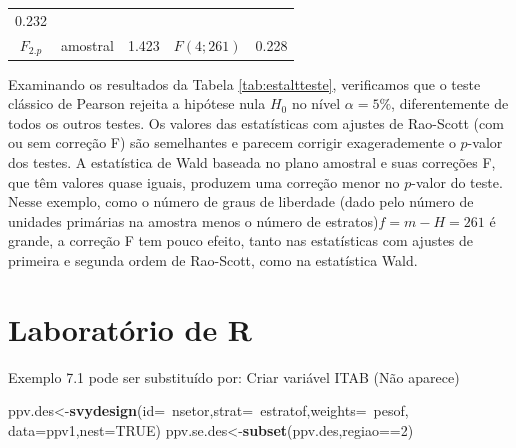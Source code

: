 \documentclass[]{book}
\newenvironment{Shaded}{\begin{snugshade}}{\end{snugshade}}
\newcommand{\KeywordTok}[1]{\textcolor[rgb]{0.13,0.29,0.53}{\textbf{{#1}}}}
\newcommand{\DataTypeTok}[1]{\textcolor[rgb]{0.13,0.29,0.53}{{#1}}}
\newcommand{\DecValTok}[1]{\textcolor[rgb]{0.00,0.00,0.81}{{#1}}}
\newcommand{\OtherTok}[1]{\textcolor[rgb]{0.56,0.35,0.01}{{#1}}}
\newcommand{\NormalTok}[1]{{#1}}
\numberwithin{example}{chapter}
\numberwithin{remark}{chapter}
\numberwithin{definition}{chapter}
\begin{document}
\begin{longtable}[]{@{}cclcr@{}}
\begin{minipage}[t]{0.08\columnwidth}
0.232\strut
\end{minipage}\tabularnewline
\begin{minipage}[t]{0.39\columnwidth}\centering\strut
\(F_{2.p}\)\strut
\end{minipage} & \begin{minipage}[t]{0.15\columnwidth}\centering\strut
amostral\strut
\end{minipage} & \begin{minipage}[t]{0.05\columnwidth}\raggedright\strut
1.423\strut
\end{minipage} & \begin{minipage}[t]{0.19\columnwidth}\centering\strut
\(F\left( 4;261\right)\)\strut
\end{minipage} & \begin{minipage}[t]{0.08\columnwidth}\raggedleft\strut
0.228\strut
\end{minipage}\tabularnewline
\bottomrule
\end{longtable}

Examinando os resultados da Tabela \ref{tab:estaltteste}, verificamos
que o teste clássico de Pearson rejeita a hipótese nula \(H_{0}\) no
nível \(\alpha =5\%\), diferentemente de todos os outros testes. Os
valores das estatísticas com ajustes de Rao-Scott (com ou sem correção
F) são semelhantes e parecem corrigir exagerademente o \(p\)-valor dos
testes. A estatística de Wald baseada no plano amostral e suas correções
F, que têm valores quase iguais, produzem uma correção menor no
\(p\)-valor do teste. Nesse exemplo, como o número de graus de liberdade
(dado pelo número de unidades primárias na amostra menos o número de
estratos)\(f=m-H=261\) é grande, a correção F tem pouco efeito, tanto
nas estatísticas com ajustes de primeira e segunda ordem de Rao-Scott,
como na estatística Wald.

\section{Laboratório de R}\label{laboratorio-de-r-4}

Exemplo 7.1 pode ser substituído por: Criar variável ITAB (Não aparece)

\begin{Shaded}
\begin{Highlighting}[]
\NormalTok{ppv.des<-}\KeywordTok{svydesign}\NormalTok{(}\DataTypeTok{id=}\NormalTok{~nsetor,}\DataTypeTok{strat=}\NormalTok{~estratof,}\DataTypeTok{weights=}\NormalTok{~pesof,}
\DataTypeTok{data=}\NormalTok{ppv1,}\DataTypeTok{nest=}\OtherTok{TRUE}\NormalTok{)}
\NormalTok{ppv.se.des<-}\KeywordTok{subset}\NormalTok{(ppv.des,regiao==}\DecValTok{2}\NormalTok{)}
\end{Highlighting}
\end{Shaded}
\end{document}
